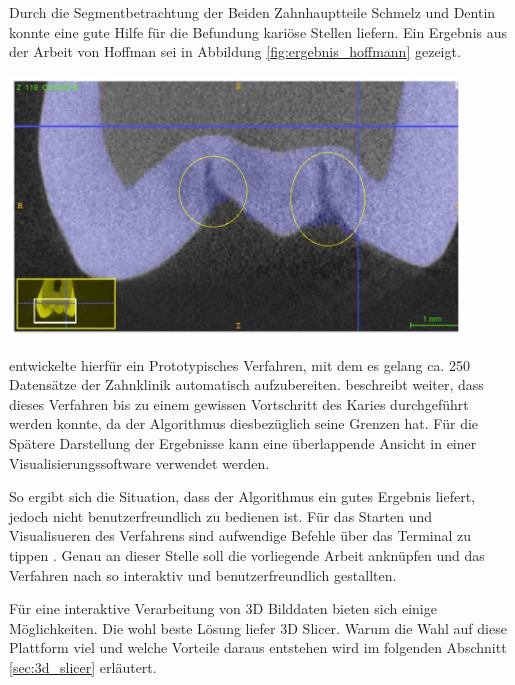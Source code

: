 \begin{minipage}{0.30\textwidth}
	Durch die Segmentbetrachtung der Beiden Zahnhauptteile Schmelz und Dentin konnte
	\citet{hoffmann2020} eine gute Hilfe für die Befundung kariöse Stellen liefern.
	Ein Ergebnis aus der Arbeit von Hoffman sei in Abbildung \ref{fig:ergebnis_hoffmann}
	gezeigt.
\end{minipage}
\hfill
\begin{minipage}{0.60\textwidth}
	\centering
	\includegraphics[width=0.9\textwidth]{img/ergebnis_hoffmann.jpg}
	\label{fig:ergebnis_hoffmann}
\end{minipage}

\citet{hoffmann2020} entwickelte hierfür ein Prototypisches Verfahren, mit dem
es gelang ca. 250 Datensätze der Zahnklinik automatisch aufzubereiten. \citet{hoffmann2020}
beschreibt weiter, dass dieses Verfahren bis zu einem gewissen Vortschritt des
Karies durchgeführt werden konnte, da der Algorithmus diesbezüglich seine Grenzen
hat. Für die Spätere Darstellung der Ergebnisse kann eine überlappende Ansicht
in einer Visualisierungssoftware verwendet werden.

So ergibt sich die Situation, dass der Algorithmus ein gutes Ergebnis liefert,
jedoch nicht benutzerfreundlich zu bedienen ist. Für das Starten und Visualisueren
des Verfahrens sind aufwendige Befehle über das Terminal zu tippen \citep[vgl.][Seite
53]{hoffmann2020}. Genau an dieser Stelle soll die vorliegende Arbeit anknüpfen
und das Verfahren nach \citet{hoffmann2020} so interaktiv und benutzerfreundlich
gestallten.

Für eine interaktive Verarbeitung von 3D Bilddaten bieten sich einige Möglichkeiten.
Die wohl beste Lösung liefer 3D Slicer. Warum die Wahl auf diese Plattform viel und
welche Vorteile daraus entstehen wird im folgenden Abschnitt \ref{sec:3d_slicer}
erläutert.

